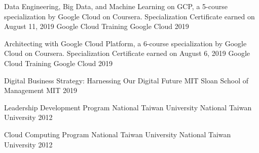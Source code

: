 

\begin{cvhonors}

  \cvhonor
    {Data Engineering, Big Data, and Machine Learning on GCP, a 5-course specialization by Google Cloud on Coursera. Specialization Certificate earned on August 11, 2019} %
    {Google Cloud Training} %
    {Google Cloud} %
    {2019} %

  \cvhonor
    {Architecting with Google Cloud Platform, a 6-course specialization by Google Cloud on Coursera. Specialization Certificate earned on August 6, 2019} %
    {Google Cloud Training} %
    {Google Cloud} %
    {2019} %

  \cvhonor
    {Digital Business Strategy: Harnessing Our Digital Future} %
    {MIT Sloan School of Management} %
    {MIT} %
    {2019} %

  \cvhonor
    {Leadership Development Program} %
    {National Taiwan University} %
    {National Taiwan University} %
    {2012} %

  \cvhonor
    {Cloud Computing Program} %
    {National Taiwan University} %
    {National Taiwan University} %
    {2012} %

\end{cvhonors}
